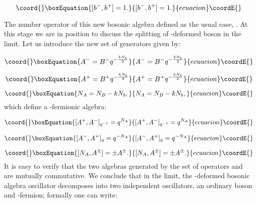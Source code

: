 \documentclass[a4paper,12pt,thmsa]{article}
\begin{document}
\begin{equation}\coord{}\boxEquation{
\lbrack b^{-},b^{+}]=1.
}{
\lbrack b^{-},b^{+}]=1.
}{ecuacion}\coordE{}\end{equation}

The number operator of this new bosonic algebra defined as the usual case, \coordHE{}. At this stage we are in position to discuss the splitting
of \coordHE{}-deformed boson in the \coordHE{} limit. Let us introduce the
new set of generators given by:

\begin{equation}\coord{}\boxEquation{
A^{-}=B^{-}q^{-\frac{kN_b}2}
}{
A^{-}=B^{-}q^{-\frac{kN_b}2}
}{ecuacion}\coordE{}\end{equation}

\begin{equation}\coord{}\boxEquation{
A^{+}=B^{+}q^{-\frac{kN_b}2}
}{
A^{+}=B^{+}q^{-\frac{kN_b}2}
}{ecuacion}\coordE{}\end{equation}

\begin{equation}\coord{}\boxEquation{
N_A=N_B-kN_b,
}{
N_A=N_B-kN_b,
}{ecuacion}\coordE{}\end{equation}
which define a \coordHE{}-fermionic algebra:

\begin{equation}\coord{}\boxEquation{
\lbrack A^{+},A^{-}]_{q^{-1}}=q^{N_A}
}{
\lbrack A^{+},A^{-}]_{q^{-1}}=q^{N_A}
}{ecuacion}\coordE{}\end{equation}

\begin{equation}\coord{}\boxEquation{
\lbrack A^{-},A^{+}]_q=q^{-N_A}
}{
\lbrack A^{-},A^{+}]_q=q^{-N_A}
}{ecuacion}\coordE{}\end{equation}

\begin{equation}\coord{}\boxEquation{
\lbrack N_A,A^{\pm }]=\pm A^{\pm }.
}{
\lbrack N_A,A^{\pm }]=\pm A^{\pm }.
}{ecuacion}\coordE{}\end{equation}
It is easy to verify that the two algebras generated by the set of operators
\coordHE{} and \coordHE{} are mutually commutative. We
conclude that in the \coordHE{} limit, the \coordHE{}-deformed bosonic
algebra oscillator decomposes into two independent oscillators, an ordinary
boson and \coordHE{}-fermion; formally one can write:
\end{document}
